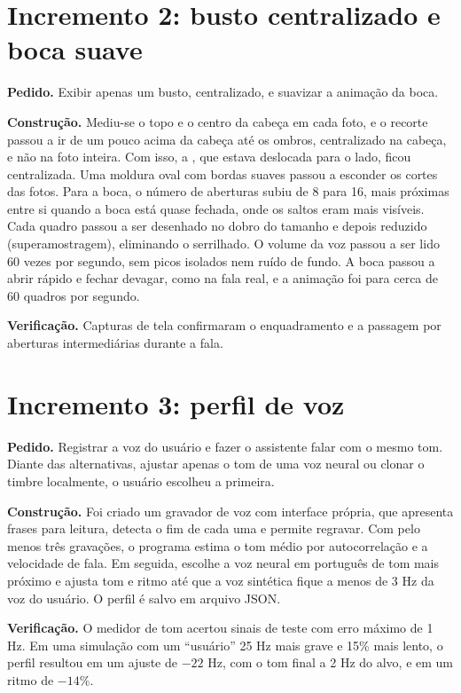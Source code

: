 \section{Incremento 2: busto centralizado e boca suave}

\textbf{Pedido.} Exibir apenas um busto, centralizado, e suavizar a animação da boca.

\textbf{Construção.} Mediu-se o topo e o centro da cabeça em cada foto, e o recorte passou a ir de um
pouco acima da cabeça até os ombros, centralizado na cabeça, e não na foto inteira. Com isso, a
, que estava deslocada para o lado, ficou centralizada. Uma moldura oval com bordas suaves
passou a esconder os cortes das fotos. Para a boca, o número de aberturas subiu de 8 para 16, mais
próximas entre si quando a boca está quase fechada, onde os saltos eram mais visíveis. Cada quadro passou
a ser desenhado no dobro do tamanho e depois reduzido (superamostragem), eliminando o serrilhado. O
volume da voz passou a ser lido 60 vezes por segundo, sem picos isolados nem ruído de fundo. A boca
passou a abrir rápido e fechar devagar, como na fala real, e a animação foi para cerca de 60 quadros por
segundo.

\textbf{Verificação.} Capturas de tela confirmaram o enquadramento e a passagem por aberturas
intermediárias durante a fala.

\section{Incremento 3: perfil de voz}

\textbf{Pedido.} Registrar a voz do usuário e fazer o assistente falar com o mesmo tom. Diante das
alternativas, ajustar apenas o tom de uma voz neural ou clonar o timbre localmente, o usuário escolheu
a primeira.

\textbf{Construção.} Foi criado um gravador de voz com interface própria, que apresenta frases para
leitura, detecta o fim de cada uma e permite regravar. Com pelo menos três gravações, o programa estima o
tom médio por autocorrelação e a velocidade de fala. Em seguida, escolhe a voz neural em português de tom
mais próximo e ajusta tom e ritmo até que a voz sintética fique a menos de 3 Hz da voz do usuário. O
perfil é salvo em arquivo JSON.

\textbf{Verificação.} O medidor de tom acertou sinais de teste com erro máximo de 1 Hz. Em uma
simulação com um “usuário” 25 Hz mais grave e 15\% mais lento, o perfil resultou em um ajuste de
$-22$ Hz, com o tom final a 2 Hz do alvo, e em um ritmo de $-14\%$.

